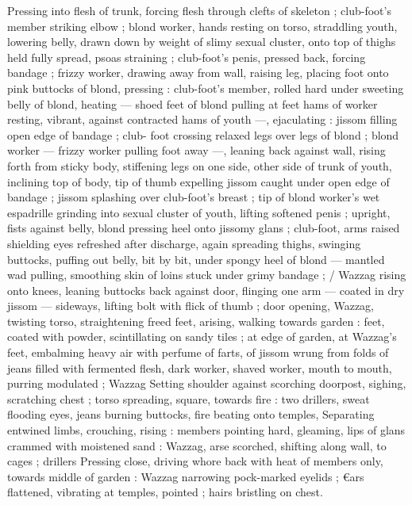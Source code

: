 Pressing into flesh of trunk, forcing flesh through clefts of skeleton 
; club-foot's member striking elbow ; blond worker, hands resting on 
torso, straddling youth, lowering belly, drawn down by weight of 
slimy sexual cluster, onto top of thighs held fully spread, psoas 
straining ; club-foot's penis, pressed back, forcing bandage ; frizzy 
worker, drawing away from wall, raising leg, placing foot onto pink 
buttocks of blond, pressing : club-foot's member, rolled hard under 
sweeting belly of blond, heating --- shoed feet of blond pulling at 
feet hams of worker resting, vibrant, against contracted hams of 
youth ---, ejaculating : jissom filling open edge of bandage ; club- 
foot crossing relaxed legs over legs of blond ; blond worker --- frizzy 
worker pulling foot away ---, leaning back against wall, rising forth 
from sticky body, stiffening legs on one side, other side of trunk of 
youth, inclining top of body, tip of thumb expelling jissom caught 
under open edge of bandage ; jissom splashing over club-foot's 
breast ; tip of blond worker's wet espadrille grinding into sexual 
cluster of youth, lifting softened penis ; upright, fists against belly, 
blond pressing heel onto jissomy glans ; club-foot, arms raised 
shielding eyes refreshed after discharge, again spreading thighs, 
swinging buttocks, puffing out belly, bit by bit, under spongy heel of 
blond --- mantled wad pulling, smoothing skin of loins stuck under 
grimy bandage ; {\slash} Wazzag rising onto knees, leaning buttocks back 
against door, flinging one arm --- coated in dry jissom --- sideways, 
lifting bolt with flick of thumb ; door opening, Wazzag, twisting torso, 
straightening freed feet, arising, walking towards garden : feet, 
coated with powder, scintillating on sandy tiles ; at edge of garden, 
at Wazzag's feet, embalming heavy air with perfume of farts, of 
jissom wrung from folds of jeans filled with fermented flesh, dark 
worker, shaved worker, mouth to mouth, purring modulated ; Wazzag 
Setting shoulder against scorching doorpost, sighing, scratching 
chest ; torso spreading, square, towards fire : two drillers, sweat 
flooding eyes, jeans burning buttocks, fire beating onto temples, 
Separating entwined limbs, crouching, rising : members pointing 
hard, gleaming, lips of glans crammed with moistened sand : 
Wazzag, arse scorched, shifting along wall, to cages ; drillers 
Pressing close, driving whore back with heat of members only, 
towards middle of garden : Wazzag narrowing pock-marked eyelids ; 
€ars flattened, vibrating at temples, pointed ; hairs bristling on chest. 
